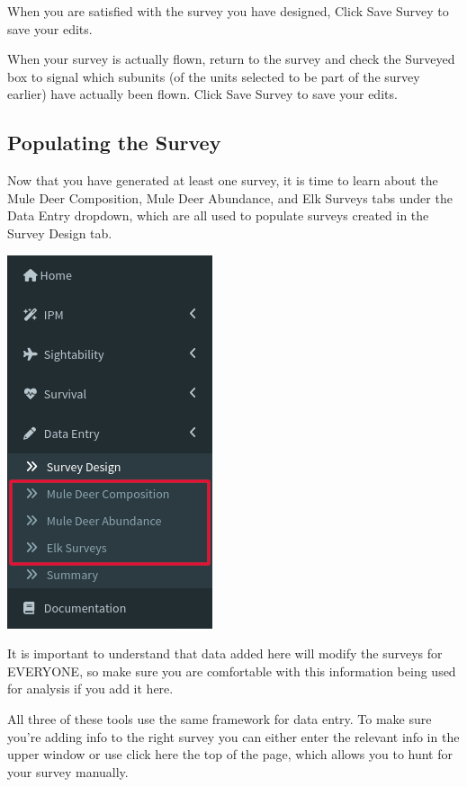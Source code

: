 \documentclass[
]{book}
\begin{document}
When you are satisfied with the survey you have designed, Click {Save Survey} to save your edits.

When your survey is actually flown, return to the survey and check the Surveyed box to signal which subunits (of the units selected to be part of the survey earlier) have actually been flown. Click {Save Survey} to save your edits.

\hypertarget{de-popul}{%
\subsection{Populating the Survey}\label{de-popul}}

Now that you have generated at least one survey, it is time to learn about the Mule Deer Composition, Mule Deer Abundance, and Elk Surveys tabs under the Data Entry dropdown, which are all used to populate surveys created in the Survey Design tab.

\includegraphics{./www/de_walk10.png}

It is important to understand that data added here will modify the surveys for EVERYONE, so make sure you are comfortable with this information being used for analysis if you add it here.

All three of these tools use the same framework for data entry. To make sure you're adding info to the right survey you can either enter the relevant info in the upper window or use {click here} the top of the page, which allows you to hunt for your survey manually.
\end{document}
